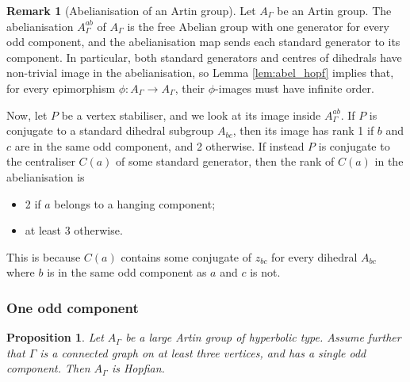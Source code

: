 \documentclass[svgnames]{amsart}
\theoremstyle{plain}
\newtheorem{prop}[thm]{Proposition}
\theoremstyle{definition}
\newtheorem{rem}[thm]{Remark}
\begin{document}
\begin{rem}[Abelianisation of an Artin group]\label{rem:abel_artin}
    Let $A_\Gamma$ be an Artin group. The abelianisation $A_\Gamma^{ab}$ of $A_\Gamma$ is the free Abelian group with one generator for every odd component, and the abelianisation map sends each standard generator to its component. In particular, both standard generators and centres of dihedrals have non-trivial image in the abelianisation, so Lemma \ref{lem:abel_hopf} implies that, for every epimorphism $\phi\colon A_\Gamma\to A_\Gamma$, their $\phi$-images must have infinite order.
    
Now, let $P$ be a vertex stabiliser, and we look at its image inside $A_\Gamma^{ab}$. If $P$ is conjugate to a standard dihedral subgroup $A_{bc}$,  then its image has rank 1 if $b$ and $c$ are in the same odd component, and 2 otherwise. If instead $P$ is conjugate to the centraliser $C(a)$ of some standard generator, then the rank of $C(a)$ in the abelianisation is
\begin{itemize}
\item 2 if $a$ belongs to a hanging component;
\item at least $3$ otherwise.
\end{itemize}
This is because $C(a)$ contains some conjugate of $z_{bc}$ for every dihedral $A_{bc}$ where $b$ is in the same odd component as $a$ and $c$ is not. 
\end{rem}


\subsubsection{One odd component}
\begin{prop}
\label{prop:odd}
    Let $A_\Gamma$ be a large Artin group of hyperbolic type. Assume further that $\Gamma$ is a connected graph on at least three vertices, and has a single odd component. Then $A_\Gamma$ is Hopfian.
\end{prop}
\end{document}
